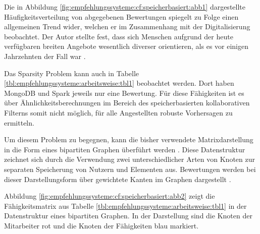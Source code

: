Die in Abbildung \ref{fig:empfehlungssysteme:cf:speicherbasiert:abb1} dargestellte Häufigkeitsverteilung von abgegebenen Bewertungen spiegelt \textcite[S. 1ff.]{anderson:2007} zu Folge einen allgemeinen Trend wider, welchen er im Zusammenhang mit der Digitalisierung beobachtet. Der Autor stellte fest, dass sich Menschen aufgrund der heute verfügbaren breiten Angebote wesentlich diverser orientieren, als es vor einigen Jahrzehnten der Fall war \cite[S. 1ff.]{anderson:2007}.

Das Sparsity Problem kann auch in Tabelle \ref{tbl:empfehlungssysteme:arbeitsweise:tbl1} beobachtet werden. Dort haben MongoDB und Spark jeweils nur eine Bewertung. Für diese Fähigkeiten ist es über Ähnlichkeitsberechnungen im Bereich des speicherbasierten kollaborativen Filterns somit nicht möglich, für alle Angestellten robuste Vorhersagen zu ermitteln.

Um diesem Problem zu begegnen, kann die bisher verwendete Matrixdarstellung in die Form eines bipartiten Graphen überführt werden \cite[S. 2f.]{huang:2004}. Diese Datenstruktur zeichnet sich durch die Verwendung zwei unterschiedlicher Arten von Knoten zur separaten Speicherung von Nutzern und Elementen aus. Bewertungen werden bei dieser Darstellungsform über gewichtete Kanten im Graphen dargestellt \cite[S. 1f.]{cao:2021}.

Abbildung \ref{fig:empfehlungssysteme:cf:speicherbasiert:abb2} zeigt die Fähigkeitsmatrix aus Tabelle \ref{tbl:empfehlungssysteme:arbeitsweise:tbl1} in der Datenstruktur eines bipartiten Graphen. In der Darstellung sind die Knoten der Mitarbeiter rot und die Knoten der Fähigkeiten blau markiert.

